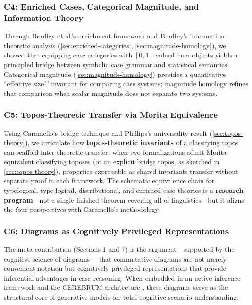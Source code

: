 \documentclass[
]{article}
\begin{document}
\subsubsection{C4: Enriched Cases, Categorical Magnitude, and
Information
Theory}\label{c4-enriched-cases-categorical-magnitude-and-information-theory}

Through Bradley et al.'s \citeyearpar{fritz2021enriched} enrichment
framework and Bradley's \citeyearpar{bradley2021entropy}
information-theoretic analysis (\autoref{sec:enriched-categories},
\autoref{sec:magnitude-homology}), we showed that equipping case
categories with \([0,1]\)-valued hom-objects yields a principled bridge
between symbolic case grammar and statistical semantics. Categorical
magnitude (\autoref{sec:magnitude-homology}) provides a quantitative
``effective size'\,' invariant for comparing case systems; magnitude
homology \citeyearpar{leinster2021magnitude} refines that comparison
when scalar magnitude does not separate two systems.

\subsubsection{C5: Topos-Theoretic Transfer via Morita
Equivalence}\label{c5-topos-theoretic-transfer-via-morita-equivalence}

Using Caramello's
\citetext{\citeyear{caramello2016bridges}; \citeyear{caramello2021five}}
bridge technique and Phillips's \citeyearpar{phillips2024lot}
universality result (\autoref{sec:topos-theory}), we articulate how
\textbf{topos-theoretic invariants} of a classifying topos can scaffold
inter-theoretic transfer: when two formalizations admit
Morita-equivalent classifying toposes (or an explicit bridge topos, as
sketched in \autoref{sec:topos-theory}), properties expressible as
shared invariants transfer without separate proof in each framework. The
schematic equivalence chain for typological, type-logical,
distributional, and enriched case theories is a \textbf{research
program}---not a single finished theorem covering all of
linguistics---but it aligns the four perspectives with Caramello's
methodology.

\subsubsection{C6: Diagrams as Cognitively Privileged
Representations}\label{c6-diagrams-as-cognitively-privileged-representations}

The meta-contribution (Sections 1 and 7) is the argument---supported by
the cognitive science of diagrams
\citep{larkin1987diagram, shimojima1996reasoning, giardino2017diagrammatic, manders2008euclidean}---that
commutative diagrams are not merely convenient notation but cognitively
privileged representations that provide inferential advantages in case
reasoning. When embedded in an active inference framework
\citep{namjoshi2026fundamentals} and the CEREBRUM architecture
\citep{friedman2024cerebrum}, these diagrams serve as the structural
core of generative models for total cognitive scenario understanding.
\end{document}
